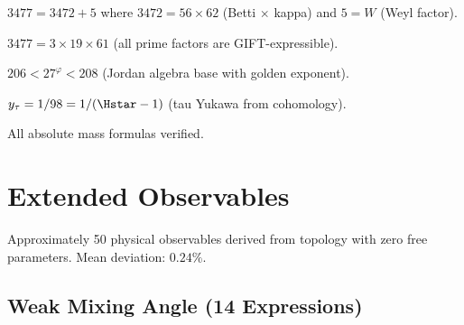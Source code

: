 \begin{theorem}\label{thm:m_tau_m_e_expanded}
    \leanok
    $3477 = 3472 + 5$ where $3472 = 56 \times 62$ (Betti $\times$ kappa) and $5 = W$ (Weyl factor).
\end{theorem}

\begin{theorem}\label{thm:m_tau_m_e_primes}
    \leanok
    $3477 = 3 \times 19 \times 61$ (all prime factors are GIFT-expressible).
\end{theorem}

\begin{theorem}[$m_\mu/m_e$ Bounds]\label{thm:m_mu_m_e_bounds}
    \leanok
    $206 < 27^\varphi < 208$ (Jordan algebra base with golden exponent).
\end{theorem}

\begin{theorem}\label{thm:y_tau}
    \leanok
    $y_\tau = 1/98 = 1/(\Hstar - 1)$ (tau Yukawa from cohomology).
\end{theorem}

\begin{theorem}\label{thm:mass_formulas}
    \leanok
    All absolute mass formulas verified.
\end{theorem}


\chapter{Extended Observables}\label{chap:observables}

Approximately 50 physical observables derived from topology with zero free parameters.
Mean deviation: $0.24\%$.

\section{Weak Mixing Angle (14 Expressions)}

